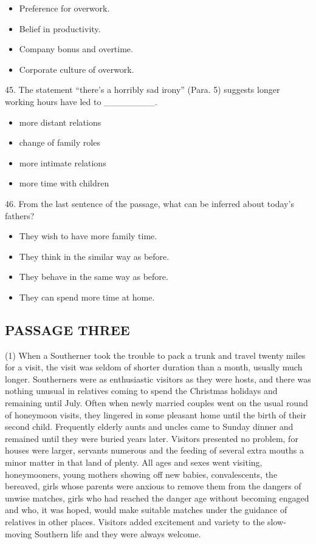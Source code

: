\documentclass[UTF8,11pt]{ctexart}
\begin{document}
\begin{itemize}[leftmargin=2em,itemsep=.2em,topsep=.4em]\item[A.] Preference for overwork.
\item[B.] Belief in productivity.
\item[C.] Company bonus and overtime.
\item[D.] Corporate culture of overwork.
\end{itemize}

45. The statement “there’s a horribly sad irony” (Para. 5) suggests longer working hours have led to \_\_\_\_\_\_\_\_.


\begin{itemize}[leftmargin=2em,itemsep=.2em,topsep=.4em]\item[A.] more distant relations
\item[B.] change of family roles
\item[C.] more intimate relations
\item[D.] more time with children
\end{itemize}

46. From the last sentence of the passage, what can be inferred about today’s fathers?


\begin{itemize}[leftmargin=2em,itemsep=.2em,topsep=.4em]\item[A.] They wish to have more family time.
\item[B.] They think in the similar way as before.
\item[C.] They behave in the same way as before.
\item[D.] They can spend more time at home.
\end{itemize}

\subsection*{\textbf{PASSAGE THREE}}


(1) When a Southerner took the trouble to pack a trunk and travel twenty miles for a visit, the visit was seldom of shorter duration than a month, usually much longer. Southerners were as enthusiastic visitors as they were hosts, and there was nothing unusual in relatives coming to spend the Christmas holidays and remaining until July. Often when newly married couples went on the usual round of honeymoon visits, they lingered in some pleasant home until the birth of their second child. Frequently elderly aunts and uncles came to Sunday dinner and remained until they were buried years later. Visitors presented no problem, for houses were larger, servants numerous and the feeding of several extra mouths a minor matter in that land of plenty. All ages and sexes went visiting, honeymooners, young mothers showing off new babies, convalescents, the bereaved, girls whose parents were anxious to remove them from the dangers of unwise matches, girls who had reached the danger age without becoming engaged and who, it was hoped, would make suitable matches under the guidance of relatives in other places. Visitors added excitement and variety to the slow-moving Southern life and they were always welcome.
\end{document}
